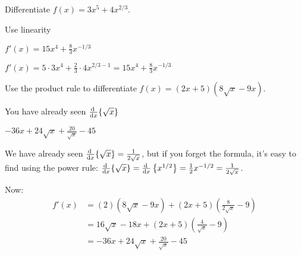 \subsection*{\Procedural}

\begin{question}Differentiate $f(x)=3x^5+4x^{2/3}$.
\end{question}
\begin{hint} Use linearity
\end{hint}
\begin{answer} $f'(x)=15x^4+\frac{8}{3}x^{-1/3}$
\end{answer}
\begin{solution}
$f'(x)=5\cdot 3x^4+\frac{2}{3}\cdot 4x^{2/3-1}
=15x^4+\frac{8}{3}x^{-1/3}$
\end{solution}





\begin{Mquestion}Use the product rule to differentiate $f(x)=(2x+5)(8\sqrt{x}-9x)$.
\end{Mquestion}
\begin{hint} You have already seen $\diff{}{x}\{\sqrt{x}\}$
\end{hint}
\begin{answer} $-36x+24\sqrt{x}+\frac{20}{\sqrt{x}}-45$
\end{answer}
\begin{solution} We have already seen $\diff{}{x}\{\sqrt{x}\}=\frac{1}{2\sqrt{x}}$, but if you forget the formula, it's easy to find using the power rule:
 $\diff{}{x}\{\sqrt{x}\}=\diff{}{x}\left\{x^{1/2}\right\}=\frac{1}{2}x^{-1/2}=\frac{1}{2\sqrt{x}}$.

 Now:
 \begin{align*}f'(x) &= (2)(8\sqrt{x}-9x)+(2x+5)\left(\frac{8}{2\sqrt{x}}-9\right)\\
 &= 16\sqrt{x}-18x+(2x+5)\left(\frac{4}{\sqrt{x}}-9\right)\\
 &=-36x+24\sqrt{x}+\frac{20}{\sqrt{x}}-45
 \end{align*}
\end{solution}




